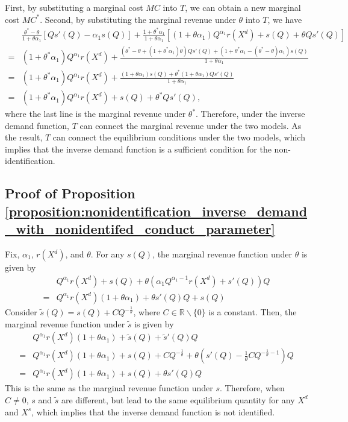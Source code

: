 \documentclass[11pt, a4paper]{article}
\theoremstyle{remark}
\begin{document}
First, by substituting a marginal cost $MC$ into $T$, we can obtain a new marginal cost $MC^{*}$.
Second, by substituting the marginal revenue under $\theta$ into $T$, we have
\begin{align}
    & \frac{\theta^{*} - \theta}{1 + \theta\alpha_1} \left[Qs'(Q) - \alpha_1s(Q) \right] + \frac{1 + \theta^{*}\alpha_1}{1 + \theta\alpha_1} \left[(1+\theta\alpha_1) Q^{\alpha_1}r(X^{d}) + s(Q) + \theta Qs'(Q)\right]\\
    = & (1 + \theta^{*}\alpha_1)Q^{\alpha_1}r(X^{d}) + \frac{(\theta^{*} - \theta + (1 + \theta^{*}\alpha_1)\theta)Qs'(Q) + (1 + \theta^{*}\alpha_1 - (\theta^{*} - \theta)\alpha_1) s(Q)}{1 + \theta\alpha_1}\\
    = & (1 + \theta^{*}\alpha_1)Q^{\alpha_1}r(X^{d}) + \frac{(1 + \theta\alpha_1) s(Q) + \theta^{*}(1 + \theta\alpha_1)Qs'(Q) }{1 + \theta\alpha_1}\\
    = & (1 + \theta^{*}\alpha_1)Q^{\alpha_1}r(X^{d}) +s(Q) + \theta^{*}Qs'(Q),
\end{align}
where the last line is the marginal revenue under $\theta^{*}$.
Therefore, under the inverse demand function, $T$ can connect the marginal revenue under the two models.
As the result, $T$ can connect the equilibrium conditions under the two models, which implies that the inverse demand function is a sufficient condition for the non-identification.




\subsection{Proof of Proposition \ref{proposition:nonidentification_inverse_demand_with_nonidentifed_conduct_parameter}}

Fix, $\alpha_1$, $r(X^{d})$, and $\theta$.
For any $s(Q)$, the marginal revenue function under $\theta$ is given by
\begin{align}
    &Q^{\alpha_1}r(X^{d}) +s(Q) + \theta(\alpha_1 Q^{\alpha_1-1}r(X^{d}) + s'(Q))Q\\
    = & Q^{\alpha_1}r(X^{d})(1+ \theta\alpha_1) + \theta s'(Q)Q + s(Q)
\end{align}
Consider $\tilde{s}(Q) = s(Q) + C Q^{-\frac{1}{\theta}}$, where $C\in \mathbb{R}\backslash \{0\}$ is a constant.
Then, the marginal revenue function under $\tilde{s}$ is given by
\begin{align}
    & Q^{\alpha_1}r(X^{d})(1 + \theta\alpha_1) + \tilde{s}(Q) + \tilde{s}'(Q)Q\\
    = & Q^{\alpha_1}r(X^{d})(1 + \theta\alpha_1) + s(Q) + C Q^{-\frac{1}{\theta}} + \theta\left(s'(Q) -\frac{1}{\theta} C Q^{-\frac{1}{\theta}-1}\right)Q\\
    =& Q^{\alpha_1}r(X^{d})(1 + \theta\alpha_1) + s(Q) + \theta s'(Q)Q
\end{align}
This is the same as the marginal revenue function under $s$.
Therefore, when $C\ne 0$, $s$ and $\tilde{s}$ are different, but lead to the same equilibrium quantity for any $X^{d}$ and $X^{s}$, which implies that the inverse demand function is not identified.
\end{document}
